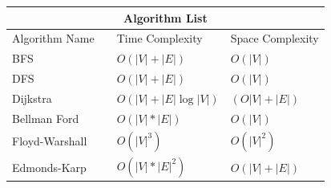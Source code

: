 \documentclass{beamer}
\begin{document}
\begin{frame}{}
    \begin{table}[]
\begin{tabular}{|llll|}
\hline
\multicolumn{4}{|c|}{Algorithm List}                                                                                       \\ \hline
\multicolumn{1}{|l|}{Algorithm Name} & \multicolumn{1}{l|}{} & \multicolumn{1}{l|}{Time Complexity}     & Space Complexity \\ \hline
\multicolumn{1}{|l|}{BFS}            & \multicolumn{1}{l|}{} & \multicolumn{1}{l|}{$O(|V|+|E|)$}        & $O(|V|)$         \\ \hline
\multicolumn{1}{|l|}{DFS}            & \multicolumn{1}{l|}{} & \multicolumn{1}{l|}{$O(|V|+|E|)$}        & $O(|V|)$         \\ \hline
\multicolumn{1}{|l|}{Dijkstra}       & \multicolumn{1}{l|}{} & \multicolumn{1}{l|}{$O(|V|+|E|\log|V|)$} & $(O|V|+|E|)$     \\ \hline
\multicolumn{1}{|l|}{Bellman Ford}   & \multicolumn{1}{l|}{} & \multicolumn{1}{l|}{$O(|V|*|E|)$}        & $O(|V|)$         \\ \hline
\multicolumn{1}{|l|}{Floyd-Warshall} & \multicolumn{1}{l|}{} & \multicolumn{1}{l|}{$O(|V|^3)$}          & $O(|V|^2)$       \\ \hline
\multicolumn{1}{|l|}{Edmonds-Karp}   & \multicolumn{1}{l|}{} & \multicolumn{1}{l|}{$O(|V|*|E|^2)$}      & $O(|V|+|E|)$     \\ \hline
\end{tabular}
\end{table}
\end{frame}
\end{document}
